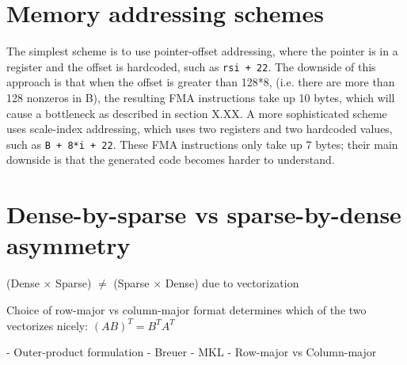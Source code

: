 \section{Memory addressing schemes}

The simplest scheme is to use pointer-offset addressing, where the pointer is in a register and the offset is hardcoded, such as \texttt{rsi + 22}. The downside of this approach is that when the offset is greater than 128*8, (i.e. there are more than 128 nonzeros in B), the resulting FMA instructions take up 10 bytes, which will cause a bottleneck as described in section X.XX. A more sophisticated scheme uses scale-index addressing, which uses two registers and two hardcoded values, such as \texttt{B + 8*i + 22}. These FMA instructions only take up 7 bytes; their main downside is that the generated code becomes harder to understand.




\section{Dense-by-sparse vs sparse-by-dense asymmetry}
(Dense $\times$ Sparse) $\neq$ (Sparse $\times$ Dense) due to vectorization

Choice of row-major vs column-major format determines which of the two vectorizes nicely: $(AB)^T = B^T A^T$

- Outer-product formulation
- Breuer
- MKL
- Row-major vs Column-major


